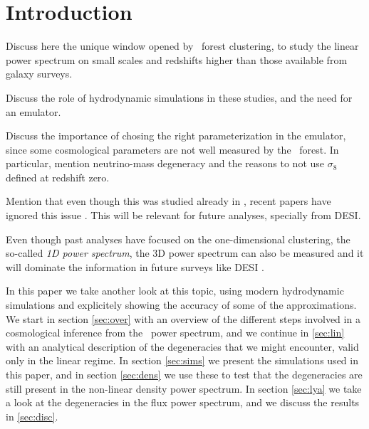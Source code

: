 \section{Introduction} 

Discuss here the unique window opened by \lya\ forest clustering, to study 
the linear power spectrum on small scales and redshifts higher than those 
available from galaxy surveys.

Discuss the role of hydrodynamic simulations in these studies, and the need 
for an emulator.

Discuss the importance of chosing the right parameterization in the emulator, 
since some cosmological parameters are not well measured by the \lya\ forest.
In particular, mention neutrino-mass degeneracy and the reasons to not use 
$\sigma_8$ defined at redshift zero.

Mention that even though this was studied already in \cite{McDonald2005a}, 
recent papers have ignored this issue \cite{Palanque-Delabrouille2015,
Yeche2017}. 
This will be relevant for future analyses, specially from DESI.

Even though past analyses have focused on the one-dimensional clustering, 
the so-called \textit{1D power spectrum}, the 3D power spectrum can also be 
measured \cite{Font-Ribera2018} and it will dominate the information in 
future surveys like DESI \cite{Font-Ribera2014}. 

In this paper we take another look at this topic, using modern hydrodynamic 
simulations and explicitely showing the accuracy of some of the approximations.
We start in section \ref{sec:over} with an overview of the different steps 
involved in a cosmological inference from the \lya\ power spectrum, and we 
continue in \ref{sec:lin} with an analytical description of the degeneracies
that we might encounter, valid only in the linear regime.
In section \ref{sec:sims} we present the simulations used in this paper, and 
in section \ref{sec:dens} we use these to test that the degeneracies are 
still present in the non-linear density power spectrum. 
In section \ref{sec:lya} we take a look at the degeneracies in the flux 
power spectrum, and we discuss the results in \ref{sec:disc}.

 
